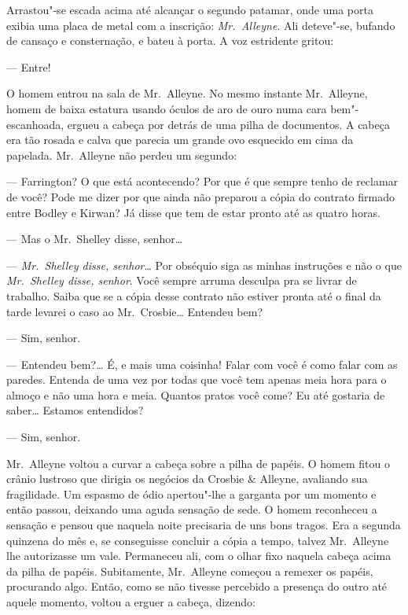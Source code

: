 Arrastou"-se escada acima até alcançar o segundo patamar, onde uma porta exibia
uma placa de metal com a inscrição: \textit{Mr.~Alleyne}.  Ali deteve"-se,
bufando de cansaço e consternação, e bateu à porta.  A voz estridente gritou:

--- Entre!

O homem entrou na sala de Mr.~Alleyne.  No mesmo instante Mr.~Alleyne, homem de
baixa estatura usando óculos de aro de ouro numa cara bem"-escanhoada, ergueu a
cabeça por detrás de uma pilha de documentos.  A cabeça era tão rosada e calva
que parecia um grande ovo esquecido em cima da papelada.  Mr.~Alleyne não
perdeu um segundo:

--- Farrington?  O que está acontecendo?  Por que é que sempre tenho de
reclamar de você?  Pode me dizer por que ainda não preparou a cópia do contrato
firmado entre Bodley e Kirwan?  Já disse que tem de estar pronto até as quatro
horas.

--- Mas o Mr.~Shelley disse, senhor\ldots{}

--- \textit{Mr.~Shelley disse, senhor}\ldots{}  Por obséquio siga as minhas
instruções e não o que \textit{Mr.~Shelley disse, senhor}.  Você sempre arruma
desculpa pra se livrar de trabalho.  Saiba que se a cópia desse contrato não
estiver pronta até o final da tarde levarei o caso ao Mr.~Crosbie\ldots{}
Entendeu bem?

--- Sim, senhor.

--- Entendeu bem?\ldots{} É, e mais uma coisinha!  Falar com você é como falar
com as paredes.  Entenda de uma vez por todas que você tem apenas meia hora
para o almoço e não uma hora e meia.  Quantos pratos você come?  Eu até
gostaria de saber\ldots{} Estamos entendidos?

--- Sim, senhor.

Mr.~Alleyne voltou a curvar a cabeça sobre a pilha de papéis.  O homem fitou o
crânio lustroso que dirigia os negócios da Crosbie \& Alleyne, avaliando sua
fragilidade.  Um espasmo de ódio apertou"-lhe a garganta por um momento e então
passou, deixando uma aguda sensação de sede.  O homem reconheceu a sensação e
pensou que naquela noite precisaria de uns bons tragos.  Era a segunda quinzena
do mês e, se conseguisse concluir a cópia a tempo, talvez Mr.~Alleyne lhe
autorizasse um vale.  Permaneceu ali, com o olhar fixo naquela cabeça acima da
pilha de papéis.  Subitamente, Mr.~Alleyne começou a remexer os papéis,
procurando algo.  Então, como se não tivesse percebido a presença do outro até
aquele momento, voltou a erguer a cabeça, dizendo:

